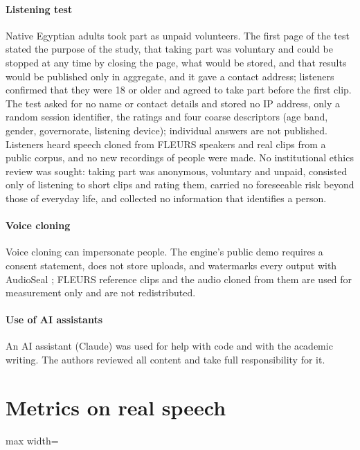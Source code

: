 \documentclass[11pt]{article}
\begin{document}
\paragraph{Listening test}
Native Egyptian adults took part as unpaid volunteers. The first page of the test stated the purpose of the study, that taking
part was voluntary and could be stopped at any time by closing the page, what would be stored, and that results would be
published only in aggregate, and it gave a contact address; listeners confirmed that they were 18 or older and agreed to
take part before the first clip. The test asked for no name or contact details and stored no IP address, only a random
session identifier, the ratings and four coarse descriptors (age band, gender, governorate, listening device);
individual answers are not published. Listeners heard speech cloned from FLEURS speakers and real clips from a public
corpus, and no new recordings of people were made. No institutional ethics review was sought: taking part was anonymous, voluntary and unpaid, consisted only of listening to short clips and rating them, carried no foreseeable risk beyond those of everyday life, and collected no information that identifies a person.

\paragraph{Voice cloning}
Voice cloning can impersonate people. The engine's public demo requires a consent statement, does not store uploads, and
watermarks every output with AudioSeal \citep{sanroman2024audioseal}; FLEURS reference clips and the audio cloned from
them are used for measurement only and are not redistributed.

\paragraph{Use of AI assistants}
An AI assistant (Claude) was used for help with code and with the academic writing. The authors reviewed all content
and take full responsibility for it.



\appendix
\section{Metrics on real speech}\label{app:calibration}
\begin{table}[h]
\centering\small
\begin{adjustbox}{max width=\linewidth}
\end{adjustbox}
\caption{Metrics on calibration speech. lahgtna-v2: real colloquial Egyptian; FLEURS: read Egyptian, mostly MSA in
register; NileTTS: synthetic colloquial speech, for comparison only.}
\label{tab:calibration}
\end{table}
\end{document}
